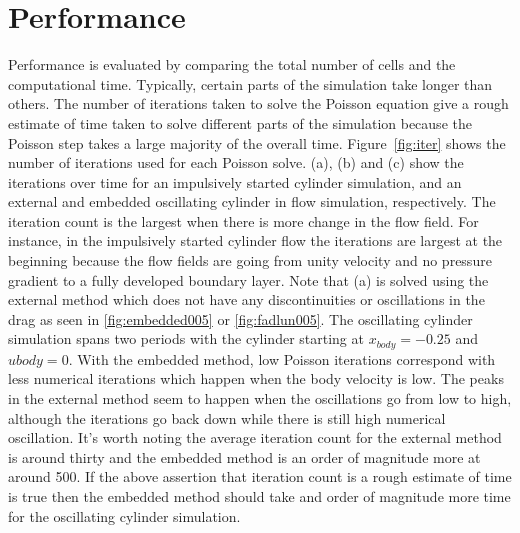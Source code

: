 \section{Performance}
Performance is evaluated by comparing the total number of cells and the computational time. 
Typically, certain parts of the simulation take longer than others. 
The number of iterations taken to solve the Poisson equation give a rough estimate of time taken to solve different parts of the simulation because the Poisson step takes a large majority of the overall time.
Figure~\ref{fig:iter} shows the number of iterations used for each Poisson solve. 
(a), (b) and (c) show the iterations over time for an impulsively started cylinder simulation, and an external and embedded oscillating cylinder in flow simulation, respectively. 
The iteration count is the largest when there is more change in the flow field. 
For instance, in the impulsively started cylinder flow the iterations are  largest at the beginning because the flow fields are going from unity velocity and no pressure gradient to a fully developed boundary layer. 
Note that (a) is solved using the external method which does not have any discontinuities or oscillations in the drag as seen in \ref{fig:embedded005} or \ref{fig:fadlun005}. 
The oscillating cylinder simulation spans two periods with the cylinder starting at $x_{body} =-0.25$ and $u{body} = 0$.
With the embedded method, low Poisson iterations correspond with less numerical iterations which happen when the body velocity is low.
The peaks in the external method seem to happen when the oscillations go from low to high, although the iterations go back down while there is still high numerical oscillation. 
It's worth noting the average iteration count for the external method is around thirty and the embedded method is an order of magnitude more at around 500. 
If the above assertion that iteration count is a rough estimate of time is true then the embedded method should take and order of magnitude more time for the oscillating cylinder simulation.
